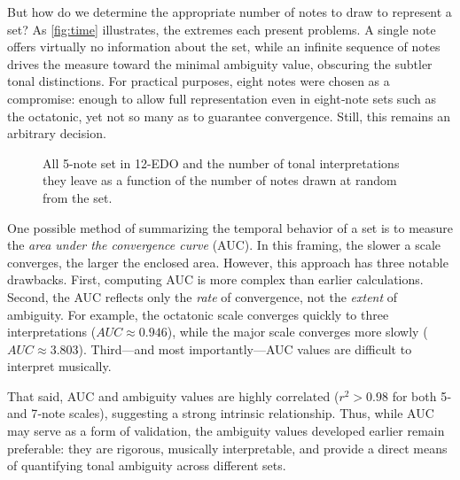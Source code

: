 \documentclass[10pt,twocolumn]{article}
\numberwithin{equation}{section} %
\begin{document}
But how do we
determine the appropriate number of notes to draw to represent a set? As \autoref{fig:time} illustrates, the extremes each present
problems. A single note offers virtually no information about the set, while an
infinite sequence of notes drives the measure toward the minimal ambiguity
value, obscuring the subtler tonal distinctions. For practical purposes, eight
notes were chosen as a compromise: enough to allow full representation even in
eight‑note sets such as the octatonic, yet not so many as to guarantee
convergence. Still, this remains an arbitrary decision.

\begin{figure}[htbp]
\centering
{}
\caption{All 5-note set in 12-EDO and the number of tonal interpretations
they leave as a function of the number of notes drawn at random from the set.}
\label{fig:time}
\end{figure}

One possible method of summarizing the temporal behavior of a set is
to measure the \textit{area under the convergence curve} (AUC). In this framing,
the slower a scale converges, the larger the enclosed area. However, this
approach has three notable drawbacks. First, computing AUC is more complex than
earlier calculations. Second, the AUC reflects only the \textit{rate} of
convergence, not the \textit{extent} of ambiguity. For example, the octatonic
scale converges quickly to three interpretations ($AUC \approx 0.946$), while the major
scale converges more slowly ($AUC \approx 3.803$). Third—and most importantly—AUC
values are difficult to interpret musically.

That said, AUC and ambiguity values are highly correlated ($r^2 > 0.98$ for both 5‑ and 7‑note scales), suggesting a strong intrinsic
relationship. Thus, while AUC may serve as a form of validation, the ambiguity
values developed earlier remain preferable: they are rigorous, musically
interpretable, and provide a direct means of quantifying tonal ambiguity across
different sets.
\end{document}
